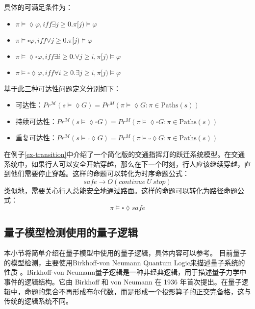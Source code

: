 具体的可满足条件为：
\begin{itemize}
    \item \(\pi\models\lozenge\varphi,iff\exists j\ge0.\pi[j)\models\varphi\)
    \item \(\pi\models\square\varphi,iff\forall j\ge 0.\pi[j)\models\varphi\)
    \item \(\pi\models\lozenge\square\varphi,iff\exists i\ge 0.\forall j\ge i,\pi[j)\models\varphi\)
    \item \(\pi\models\square\lozenge\varphi,iff\forall i\ge 0.\exists j\ge i,\pi[j)\models\varphi\)
\end{itemize}
基于此三种可达性问题定义分别如下：
\begin{itemize}
    \item 可达性：\( Pr^{\mathcal{M}}(s \models \lozenge G) = Pr^M(\pi \models \lozenge G : \pi \in \text{Paths}(s))\)
    \item 持续可达性：\( Pr^{\mathcal{M}}(s \models \lozenge \square G) = Pr^M(\pi \models \lozenge \square G : \pi \in \text{Paths}(s))\)
    \item 重复可达性：\( Pr^{\mathcal{M}}(s \models\square \lozenge G) = Pr^M(\pi \models \square\lozenge G : \pi \in \text{Paths}(s))\)
\end{itemize}
\begin{example}
    在例子\ref{ex-transition}中介绍了一个简化版的交通指挥灯的跃迁系统模型。在交通系统中，如果行人可以安全开始穿越，那么在下一个时刻，行人应该继续穿越，直到他们需要停止穿越。这样的命题可以转化为时序命题公式：
    \begin{equation}
        safe \rightarrow O(continue\ U\ stop )
    \end{equation}
    类似地，需要关心行人总能安全地通过路面。这样的命题可以转化为路径命题公式：
    \begin{equation}
        \pi \models \square\lozenge safe
    \end{equation}
\end{example}

\subsection{量子模型检测使用的量子逻辑}
本小节将简单介绍在量子模型中使用的量子逻辑，具体内容可以参考\citep{2021}。
目前量子的模型检测，主要使用Birkhoff-von Neumann Quantum Logic来描述量子系统的性质
。Birkhoff-von Neumann量子逻辑是一种非经典逻辑，用于描述量子力学中事件的逻辑结构。它由 Birkhoff 和 von Neumann 在 1936 年首次提出。在量子逻辑中，命题的集合不再形成布尔代数，而是形成一个投影算子的正交完备格，这与传统的逻辑系统不同。


